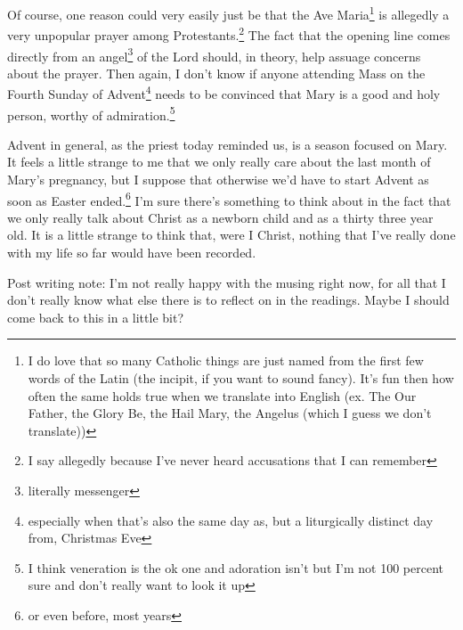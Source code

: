 \documentclass[12pt]{article}[titlepage]
\newcommand{\1}{\={a}}
\newcommand{\2}{\={e}}
\newcommand{\3}{\={\i}}
\newcommand{\4}{\=o}
\newcommand{\5}{\=u}
\newcommand{\6}{\={A}}
\renewcommand{\,}{\textsuperscript{,}}
\begin{document}
Of course, one reason could very easily just be that the Ave Maria\footnote{I do love that so many Catholic things are just named from the first few words of the Latin (the incipit, if you want to sound fancy). It's fun then how often the same holds true when we translate into English (ex. The Our Father, the Glory Be, the Hail Mary, the Angelus (which I guess we don't translate))} is allegedly a very unpopular prayer among Protestants.\footnote{I say allegedly because I've never heard accusations that I can remember}
The fact that the opening line comes directly from an angel\footnote{literally messenger} of the Lord should, in theory, help assuage concerns about the prayer.
Then again, I don't know if anyone attending Mass on the Fourth Sunday of Advent\footnote{especially when that's also the same day as, but a liturgically distinct day from, Christmas Eve} needs to be convinced that Mary is a good and holy person, worthy of admiration.\footnote{I think veneration is the ok one and adoration isn't but I'm not 100 percent sure and don't really want to look it up}

Advent in general, as the priest today reminded us, is a season focused on Mary.
It feels a little strange to me that we only really care about the last month of Mary's pregnancy, but I suppose that otherwise we'd have to start Advent as soon as Easter ended.\footnote{or even before, most years}
I'm sure there's something to think about in the fact that we only really talk about Christ as a newborn child and as a thirty three year old.
It is a little strange to think that, were I Christ, nothing that I've really done with my life so far would have been recorded.

Post writing note:
I'm not really happy with the musing right now, for all that I don't really know what else there is to reflect on in the readings.
Maybe I should come back to this in a little bit?
\end{document}
